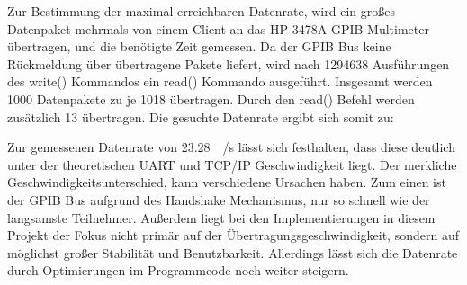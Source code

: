 Zur Bestimmung der maximal erreichbaren Datenrate, wird ein großes Datenpaket mehrmals von einem Client an das \ac{HP} 3478A \ac{GPIB} Multimeter übertragen, und die benötigte Zeit gemessen. Da der \ac{GPIB} Bus keine Rückmeldung über übertragene Pakete liefert, wird nach 1294638 Ausführungen des write() Kommandos ein read() Kommando ausgeführt. Insgesamt werden 1000 Datenpakete zu je \SI{1018}{\byte} übertragen. Durch den read() Befehl werden zusätzlich \SI{13}{\byte} übertragen. Die gesuchte Datenrate ergibt sich somit zu: 


Zur gemessenen Datenrate von \SI{23,28}{\kilo\byte/\second} lässt sich festhalten, dass diese deutlich unter der theoretischen \ac{UART} und \ac{TCP/IP} Geschwindigkeit liegt. Der merkliche Geschwindigkeitsunterschied, kann verschiedene Ursachen haben. Zum einen ist der \ac{GPIB} Bus aufgrund des Handshake Mechanismus, nur so schnell wie der langsamste Teilnehmer. Außerdem liegt bei den Implementierungen in diesem Projekt der Fokus nicht primär auf der Übertragungsgeschwindigkeit, sondern auf möglichst großer Stabilität und Benutzbarkeit. Allerdings lässt sich die Datenrate durch Optimierungen im Programmcode noch weiter steigern. 

